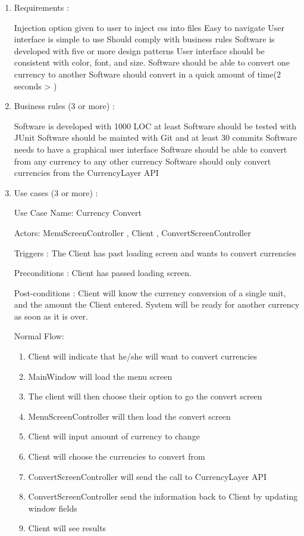 \documentclass[12pt]{article}
\begin{document}
\begin{enumerate}
\item   Requirements : 

\subitem Injection option given to user to inject css into files
\subitem Easy to navigate
\subitem User interface is simple to use
\subitem Should comply with business rules
\subitem Software is developed with five or more design patterns
\subitem User interface should be consistent with color, font, and size.
\subitem Software should be able to convert one currency to another
\subitem Software should convert in a quick amount of time(2 seconds > )



\item   Business rules (3 or more) : 

\subitem Software is developed with 1000 LOC at least
\subitem Software should be tested with JUnit
\subitem Software should be mainted with Git and at least 30 commits
\subitem Software needs to have a graphical user interface
\subitem Software should be able to convert from any currency to any other currency
\subitem Software should only convert currencies from the CurrencyLayer API


\item   Use cases (3 or more) : 

Use Case Name: Currency Convert

Actors: MenuScreenController , Client , ConvertScreenController

Triggers : The Client has past loading screen and wants to convert currencies

Preconditions : Client has passed loading screen.

Post-conditions : Client will know the currency conversion of a single unit, and the amount the Client entered. System will be ready for another currency as soon as it is over.

Normal Flow:

\begin{enumerate}
	\item Client will indicate that he/she will want to convert currencies
	\item MainWindow will load the menu screen 
	\item The client will then choose their option to go the convert screen
	\item MenuScreenController will then load the convert screen
	\item Client will input amount of currency to change
	\item Client will choose the currencies to convert from
	\item ConvertScreenController will send the call to CurrencyLayer API
	\item ConvertScreenController send the information back to Client by updating window fields
	\item Client will see results
\end{enumerate}


\end{enumerate}
\end{document}
